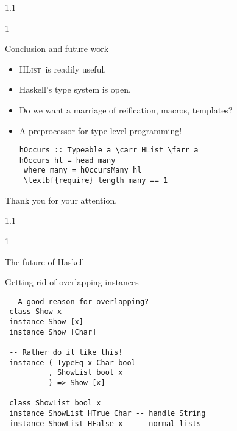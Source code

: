 \documentclass{slides}
\newenvironment{myslide}{\begin{slide}\color{Blue}\begin{boxedminipage}{1.1\hsize}\begin{boxedminipage}{1\hsize}\color{Black}
\vspace{-170\in}
}{%
\smallskip
\end{boxedminipage}
\end{boxedminipage}
\end{slide}}
\newenvironment{myslide}{\begin{slide}
}{%
\end{slide}}
\newenvironment{myslide}{\begin{slide}\color{White}\begin{boxedminipage}{1.1\hsize}\color{Black}
\vspace{-170\in}
}{%
\smallskip
\end{boxedminipage}
\end{slide}}
\newcommand{\littleskip}{\topsep8pt \parskip8pt \partopsep8pt}
\newcommand{\header}[1]{{\large \color{Red} #1}}
\newcommand{\blau}[1]{{\vspace{-50\in}\normalsize \color{Blue} #1}}
\newcommand{\HList}{\textsc{HList}}
\newcommand{\farr}{\ensuremath{\to}}
\newcommand{\carr}{\ensuremath{\Rightarrow}}
\begin{document}
\begin{myslide}

\bigskip

\header{Conclusion and future work}

\medskip

{\small

\littleskip\begin{itemize}

\item \HList\ is readily useful.

\item Haskell's type system is open.

\item Do we want a marriage of reification, macros, templates?

\item A preprocessor for type-level programming!

\begin{Verbatim}[fontseries=normal,fontsize=\tiny,commandchars=\\\{\}]
hOccurs :: Typeable a \carr HList \farr a
hOccurs hl = head many
 where many = hOccursMany hl
 \textbf{require} length many == 1
\end{Verbatim}

\end{itemize}

Thank you for your attention.

}

\end{myslide}






\begin{myslide}

\header{The future of Haskell}

\vspace{-77\in}

\blau{Getting rid of overlapping instances}

\medskip

\begin{Verbatim}[fontseries=normal,fontsize=\small,commandchars=\\\{\}]
 -- A good reason for overlapping?
 class Show x 
 instance Show [x]
 instance Show [Char]

 -- Rather do it like this!
 instance ( TypeEq x Char bool
          , ShowList bool x 
          ) => Show [x]

 class ShowList bool x
 instance ShowList HTrue Char -- handle String
 instance ShowList HFalse x   -- normal lists
\end{Verbatim}

\end{myslide}
\end{document}
